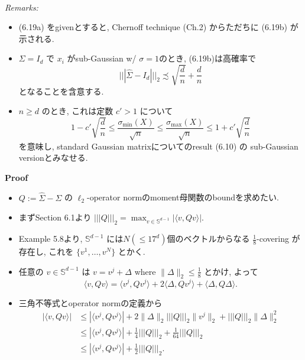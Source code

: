 \documentclass[unicode,aspectratio=169,11pt]{beamer}
\newcommand{\bb}{\mathbb}
\begin{document}
\begin{frame}{}{}
  　\\
  {\it Remarks:}
  \begin{itemize}
    \item (6.19a) をgivenとすると, Chernoff technique (Ch.2) からただちに (6.19b) が示される.
    \item $\Sigma = I_d$ で $x_i$ がsub-Gaussian w/ $\sigma = 1$のとき, (6.19b)は高確率で
          \[ |||\widehat{\Sigma} - I_d|||_2 \precsim \sqrt{\frac{d}{n}}+\frac{d}{n}\]
          となることを含意する.
    \item $n \ge d$ のとき, これは定数 $c' > 1$ について
          \[
            1 - c' \sqrt{\frac{d}{n}}
            \le \frac{\sigma_{\min}(X)}{\sqrt{n}}
            \le \frac{\sigma_{\max}(X)}{\sqrt{n}}
            \le 1 + c' \sqrt{\frac{d}{n}}
            \tag{6.20}
          \]
          を意味し, standard Gaussian matrixについてのresult (6.10) の sub-Gaussian versionとみなせる.
  \end{itemize}
\end{frame}

\begin{frame}{}{}
  {\bf Proof}
  \begin{itemize}
    \item $Q := \widehat{\Sigma} - \Sigma$ の $\ell_2$-operator normのmoment母関数のboundを求めたい.
    \item まずSection 6.1より $||| Q |||_2 = \max_{v \in \bb{S}^{d-1}} |\langle v, Qv \rangle|$.
    \item Example 5.8より, $\bb{S}^{d-1}$ には$N (\le 17^d)$個のベクトルからなる $\frac{1}{8}$-covering が存在し, これを $\{v^1 ,\dots, v^N\}$ とかく.
    \item 任意の $v \in \bb{S}^{d-1}$ は $v = v^j + \Delta$ where $\|\Delta\|_2 \le \frac{1}{8}$ とかけ, よって
            \[
              \langle v, Qv \rangle
              = \langle v^j, Qv^j \rangle + 2\langle \Delta, Qv^j \rangle + \langle \Delta, Q\Delta \rangle.
            \]
    \item 三角不等式とoperator normの定義から
            \begin{align*}
              |\langle v, Qv \rangle|
              &\le |\langle v^j, Qv^j \rangle| + 2\|\Delta\|_2 |||Q|||_2 \|v^j\|_2 + |||Q|||_2\|\Delta\|_2^2\\
              &\le |\langle v^j, Qv^j \rangle| + \frac{1}{4} |||Q|||_2 + \frac{1}{64} |||Q|||_2\\
              &\le |\langle v^j, Qv^j \rangle| + \frac{1}{2}|||Q|||_2.
            \end{align*}
  \end{itemize}
\end{frame}
\end{document}

